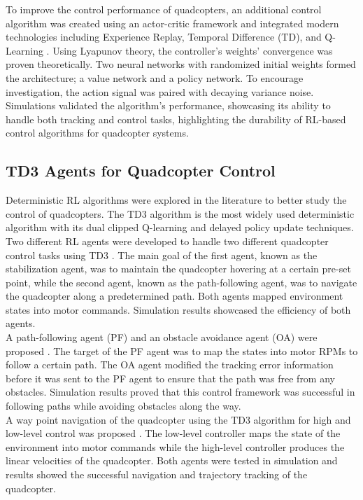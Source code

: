     To improve the control performance of quadcopters, an additional control algorithm was created using an actor-critic framework and integrated modern technologies including Experience Replay, Temporal Difference (TD), and Q-Learning \cite{second}. Using Lyapunov theory, the controller's weights' convergence was proven theoretically. Two neural networks with randomized initial weights formed the architecture; a value network and a policy network. To encourage investigation, the action signal was paired with decaying variance noise. Simulations validated the algorithm's performance, showcasing its ability to handle both tracking and control tasks, highlighting the durability of RL-based control algorithms for quadcopter systems.
    \subsection{TD3 Agents for Quadcopter Control}
    Deterministic RL algorithms were explored in the literature to better study the control of quadcopters. The TD3 algorithm is the most widely used deterministic algorithm with its dual clipped Q-learning and delayed policy update techniques.\\
    
    Two different RL agents were developed to handle two different quadcopter control tasks using TD3 \cite{mazen}. The main goal of the first agent, known as the stabilization agent, was to maintain the quadcopter hovering at a certain pre-set point, while the second agent, known as the path-following agent, was to navigate the quadcopter along a predetermined path. Both agents mapped environment states into motor commands. Simulation results showcased the efficiency of both agents.\\

       A path-following agent (PF) and an obstacle avoidance agent (OA) were proposed \cite{Mokhtar}. The target of the PF agent was to map the states into motor RPMs to follow a certain path. The OA agent modified the tracking error information before it was sent to the PF agent to ensure that the path was free from any obstacles. Simulation results proved that this control framework was successful in following paths while avoiding obstacles along the way.\\

    A way point navigation of the quadcopter using the TD3 algorithm for high and low-level control was proposed \cite{HIMANSHU2022281}. The low-level controller maps the state of the environment into motor commands while the high-level controller produces the linear velocities of the quadcopter. Both agents were tested in simulation and results showed the successful navigation and trajectory tracking of the quadcopter.\clearpage
    
